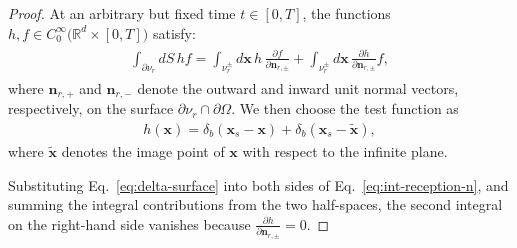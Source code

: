 \documentclass[11pt,reqno]{amsart}
\theoremstyle{remark}
\theoremstyle{italic_lemma}
\newcommand{\bx}{\boldsymbol{x}}
\newcommand{\bn}{\boldsymbol{n}}
\newcommand{\btx}{\tilde{\bx}}
\begin{document}
\begin{proof}
At an arbitrary but fixed time \( t \in [0,T] \), the functions \( h, f \in C_0^{\infty} \big( \mathbb{R}^d \times [0,T] \big) \) satisfy:
\begin{align}  \label{eq:int-reception-n}
\begin{split}
     \int_{\partial \nu_r} dS \, h  f = \int_{ \nu_r^\pm} d\bx \, h \, \frac{\partial f}{\partial \bn_{r,\pm}} + \int_{\nu_r^\pm} d\bx \, \frac{\partial h}{\partial \bn_{r,\pm}}  f,
\end{split}
\end{align}
where $\bn_{r,+}$ and $\bn_{r,-}$ denote the outward and inward unit normal vectors, respectively, on the surface $\partial \nu_r \cap \partial \Omega$. We then choose the test function as
\begin{align}  \label{eq:delta-surface}
h(\bx) = \delta_b(\bx_s - \bx) +  \delta_b(\bx_s - \btx),
\end{align}
where \(\btx\) denotes the image point of \(\bx\) with respect to the infinite plane.

\noindent
Substituting Eq.~\eqref{eq:delta-surface} into both sides of 
Eq.~\eqref{eq:int-reception-n}, and summing the integral contributions from the two half-spaces, the second integral on the right-hand side vanishes because \(\tfrac{\partial h}{\partial \bn_{r,\pm}}=0 \). 



\end{proof}
\end{document}
